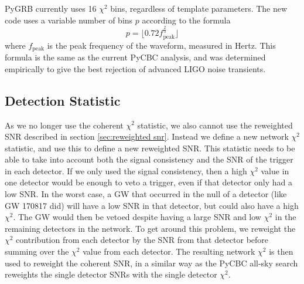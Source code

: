 \documentclass[11pt]{cuthesis}
\begin{document}
PyGRB currently uses 16 $\chi^2$ bins, regardless of template parameters. The new code uses a variable number of bins $p$ according to the formula
\begin{equation}
p = \lfloor 0.72 f_\text{peak}^\frac{2}{3} \rfloor
\end{equation}
where $f_\text{peak}$ is the peak frequency of the waveform, measured in Hertz. This formula is the same as the current PyCBC analysis, and was determined empirically to give the best rejection of advanced LIGO noise transients. \cite{GW150914_searches}

\subsection{Detection Statistic} \label{sec:new det stat}
As we no longer use the coherent $\chi^2$ statistic, we also cannot use the reweighted SNR described in section \ref{sec:reweighted snr}. Instead we define a new network $\chi^2$ statistic, and use this to define a new reweighted SNR. This statistic needs to be able to take into account both the signal consistency and the SNR of the trigger in each detector. If we only used the signal consistency, then a high $\chi^2$ value in one detector would be enough to veto a trigger, even if that detector only had a low SNR. In the worst case, a GW that occurred in the null of a detector (like GW 170817 did) will have a low SNR in that detector, but could also have a high $\chi^2$. The GW would then be vetoed despite having a large SNR and low $\chi^2$ in the remaining detectors in the network. To get around this problem, we reweight the $\chi^2$ contribution from each detector by the SNR from that detector before summing over the $\chi^2$ value from each detector. The resulting network $\chi^2$ is then used to reweight the coherent SNR, in a similar way as the PyCBC all-sky search reweights the single detector SNRs with the single detector $\chi^2$. 
\end{document}
